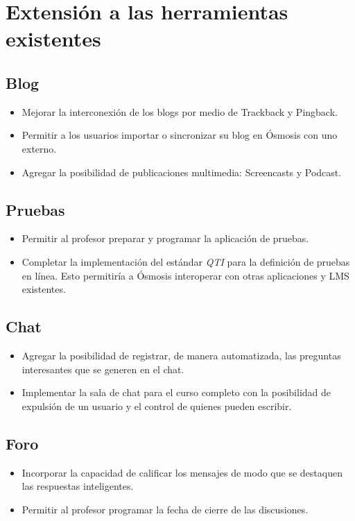 \section*{Extensión a las herramientas existentes}
\subsection*{Blog}
\begin{itemize}
	\item Mejorar la interconexión de los blogs por medio de Trackback y Pingback.
	\item Permitir a los usuarios importar o sincronizar su blog en Ósmosis con uno externo.
	\item Agregar la posibilidad de publicaciones multimedia: Screencasts y Podcast.
\end{itemize}

\subsection*{Pruebas}
\begin{itemize}
	\item Permitir al profesor preparar y programar la aplicación de pruebas.
	\item Completar la implementación del estándar \emph{QTI} para la definición de pruebas en línea. Esto permitiría a Ósmosis interoperar con otras aplicaciones y LMS existentes.
\end{itemize}

\subsection*{Chat}
\begin{itemize}
	\item Agregar la posibilidad de registrar, de manera automatizada, las preguntas interesantes que se generen en el chat.
	\item Implementar la sala de chat para el curso completo con la posibilidad de expulsión de un usuario y el control de quienes pueden escribir.
\end{itemize}

\subsection*{Foro}
\begin{itemize}
	\item Incorporar la capacidad de calificar los mensajes de modo que se destaquen las respuestas inteligentes.
	\item Permitir al profesor programar la fecha de cierre de las discusiones.
\end{itemize}

